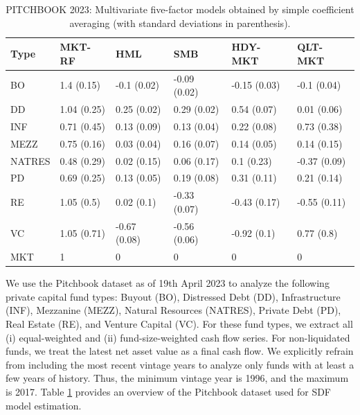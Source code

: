 \documentclass[12pt]{article}
\begin{document}
\begin{table}[ht]
	\centering
	\begin{tabular}{llllll}
		Type & MKT-RF & HML & SMB & HDY-MKT & QLT-MKT \\ 
		\hline
		\hline
		BO & 1.4 (0.15) & -0.1 (0.02) & -0.09 (0.02) & -0.15 (0.03) & -0.1 (0.04) \\ 
		DD & 1.04 (0.25) & 0.25 (0.02) & 0.29 (0.02) & 0.54 (0.07) & 0.01 (0.06) \\ 
		INF & 0.71 (0.45) & 0.13 (0.09) & 0.13 (0.04) & 0.22 (0.08) & 0.73 (0.38) \\ 
		MEZZ & 0.75 (0.16) & 0.03 (0.04) & 0.16 (0.07) & 0.14 (0.05) & 0.14 (0.15) \\ 
		NATRES & 0.48 (0.29) & 0.02 (0.15) & 0.06 (0.17) & 0.1 (0.23) & -0.37 (0.09) \\ 
		PD & 0.69 (0.25) & 0.13 (0.05) & 0.19 (0.08) & 0.31 (0.11) & 0.21 (0.14) \\ 
		RE & 1.05 (0.5) & 0.02 (0.1) & -0.33 (0.07) & -0.43 (0.17) & -0.55 (0.11) \\ 
		VC & 1.05 (0.71) & -0.67 (0.08) & -0.56 (0.06) & -0.92 (0.1) & 0.77 (0.8) \\ 
		\hline
		MKT & 1 & 0 & 0 & 0 & 0 \\ 
		\hline
		\hline
	\end{tabular}
	\caption{
		PITCHBOOK 2023: Multivariate five-factor models obtained by simple coefficient averaging (with standard deviations in parenthesis).
	} 
	\label{tab:average_coefs_2023}
\end{table}

We use the Pitchbook dataset as of 19th April 2023 to analyze the following private capital fund types: 
Buyout (BO), 
Distressed Debt (DD), 
Infrastructure (INF), 
Mezzanine (MEZZ),
Natural Resources (NATRES), 
Private Debt (PD), 
Real Estate (RE), 
and Venture Capital (VC).
For these fund types, we extract all (i) equal-weighted and (ii) fund-size-weighted cash flow series.
For non-liquidated funds, we treat the latest net asset value as a final cash flow.
We explicitly refrain from including the most recent vintage years to analyze only funds with at least a few years of history.
Thus, the minimum vintage year is 1996, and the maximum is 2017.
Table \ref{tab:average_coefs_2023} provides an overview of the Pitchbook dataset used for SDF model estimation.
\end{document}
